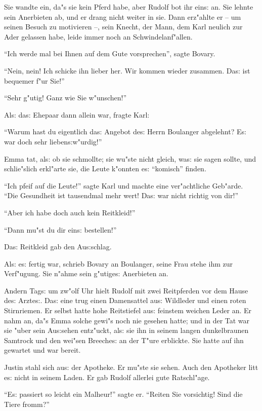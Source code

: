 \documentclass[oneside,12pt]{book}
\newcommand{\s}{s:}%
\begin{document}
Sie wandte ein, da"s sie kein Pferd habe, aber Rudolf bot ihr
ein{\s} an. Sie lehnte sein Anerbieten ab, und er drang nicht
weiter in sie. Dann erz"ahlte er -- um seinen Besuch zu motivieren
--, sein Knecht, der Mann, dem Karl neulich zur Ader gelassen
habe, leide immer noch an Schwindelanf"allen.

"`Ich werde mal bei Ihnen auf dem Gute vorsprechen"', sagte
Bovary.

"`Nein, nein! Ich schicke ihn lieber her. Wir kommen wieder
zusammen. Da{\s} ist bequemer f"ur Sie!"'

"`Sehr g"utig! Ganz wie Sie w"unschen!"'

Al{\s} da{\s} Ehepaar dann allein war, fragte Karl:

"`Warum hast du eigentlich da{\s} Angebot de{\s} Herrn Boulanger
abgelehnt? E{\s} war doch sehr lieben{\s}w"urdig!"'

Emma tat, al{\s} ob sie schmollte; sie wu"ste nicht gleich, wa{\s}
sie sagen sollte, und schlie"slich erkl"arte sie, die Leute
k"onnten e{\s} "`komisch"' finden.

"`Ich pfeif auf die Leute!"' sagte Karl und machte eine
ver"achtliche Ge\-b"arde. "`Die Gesundheit ist tausendmal mehr
wert! Da{\s} war nicht richtig von dir!"'

"`Aber ich habe doch auch kein Reitkleid!"'

"`Dann mu"st du dir ein{\s} bestellen!"'

Da{\s} Reitkleid gab den Au{\s}schlag.

Al{\s} e{\s} fertig war, schrieb Bovary an Boulanger, seine Frau
stehe ihm zur Verf"ugung. Sie n"ahme sein g"utige{\s} Anerbieten
an.

Andern Tag{\s} um zw"olf Uhr hielt Rudolf mit zwei Reitpferden vor
dem Hause de{\s} Arzte{\s}. Da{\s} eine trug einen Damensattel
au{\s} Wildleder und einen roten Stirnriemen. Er selbst hatte hohe
Reitstiefel au{\s} feinstem weichen Leder an. Er nahm an, da"s
Emma solche gewi"s noch nie gesehen hatte; und in der Tat war sie
"uber sein Au{\s}sehen ent\/z"uckt, al{\s} sie ihn in seinem langen
dunkelbraunen Samtrock und den wei"sen Breeche{\s} an der T"ure
erblickte. Sie hatte auf ihn gewartet und war bereit.

Justin stahl sich au{\s} der Apotheke. Er mu"ste sie sehen. Auch
den Apotheker litt e{\s} nicht in seinem Laden. Er gab Rudolf
allerlei gute Ratschl"age.

"`E{\s} passiert so leicht ein Malheur!"' sagte er. "`Reiten Sie
vorsichtig! Sind die Tiere fromm?"'
\end{document}
